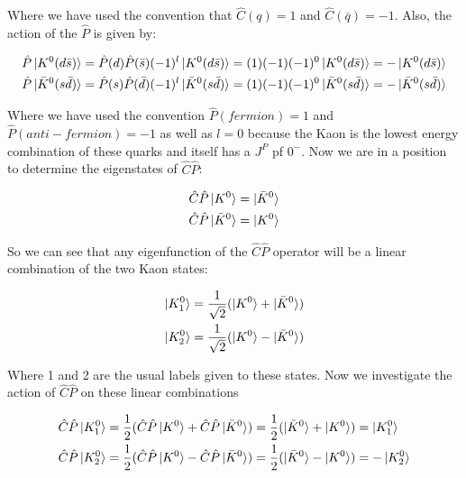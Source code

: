\noindent Where we have used the convention that $\hat{C} (q) = 1$ and $\hat{C} (\bar{q}) = -1$. Also, the action of the $\hat{P}$ is given by:
    
\begin{align*}
\hat{P} \ket{K^{0}(d \bar{s})} = \hat{P}(d) \hat{P}(\bar{s})(-1)^{l} \ket{K^{0}(d \bar{s})} = (1)(-1)(-1)^0 \ket{K^{0}(d \bar{s})} = - \ket{K^{0}(d \bar{s})} \\
\hat{P} \ket{\bar{K}^{0}(s \bar{d})} = \hat{P}(s) \hat{P}(\bar{d})(-1)^{l} \ket{\bar{K}^{0}(s \bar{d})} = (1)(-1)(-1)^0 \ket{\bar{K}^{0}(s \bar{d})} = - \ket{\bar{K}^{0}(s \bar{d})} 
\end{align*}

\smallskip

\noindent Where we have used the convention $\hat{P} (fermion) = 1$ and $\hat{P} (anti-fermion) = -1$ as well as $l=0$ because the Kaon is the lowest energy combination of these quarks and itself has a $J^{P}$ pf $0^{-}$. Now we are in a position to determine the eigenstates of $\hat{C}\hat{P}$:

\begin{align*}
\hat{C}\hat{P} \ket{K^{0}} = \ket{\bar{K}^{0}} \\
\hat{C}\hat{P} \ket{\bar{K}^{0}} = \ket{K^{0}} 
\end{align*}

\noindent So we can see that any eigenfunction of the $\hat{C}\hat{P}$ operator will be a linear combination of the two Kaon states:

\begin{align}\label{FirstKaonLinComb}
\ket{K^{0}_{1}} = \frac{1}{\sqrt{2}} (\ket{K^{0}} + \ket{\bar{K}^{0}}) \\
\ket{K^{0}_{2}} = \frac{1}{\sqrt{2}} (\ket{K^{0}} - \ket{\bar{K}^{0}})
\end{align} 

\noindent Where 1 and 2 are the usual labels given to these states. Now we investigate the action of $\hat{C}\hat{P}$ on these linear combinations

\smallskip

\begin{align*}
\hat{C}\hat{P} \ket{K^{0}_{1}} & = \frac{1}{2} (\hat{C}\hat{P} \ket{K^{0}} + \hat{C}\hat{P} \ket{\bar{K}^{0}}) = \frac{1}{2} (\ket{\bar{K}^{0}} + \ket{K^{0}}) = \ket{K^{0}_{1}} \\
\hat{C}\hat{P} \ket{K^{0}_{2}} & = \frac{1}{2} (\hat{C}\hat{P} \ket{K^{0}} - \hat{C}\hat{P} \ket{\bar{K}^{0}}) =   \frac{1}{2} (\ket{\bar{K}^{0}} - \ket{K^{0}}) = - \ket{K^{0}_{2}} \\
\end{align*} 

